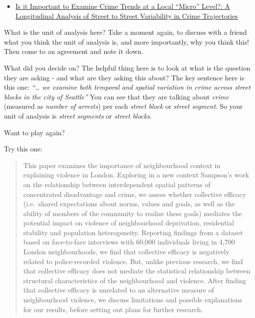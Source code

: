 \documentclass[
]{book}
\providecommand{\tightlist}{%
  \setlength{\itemsep}{0pt}\setlength{\parskip}{0pt}}
\begin{document}
\begin{itemize}
\tightlist
\item
  \href{https://link.springer.com/article/10.1007/s10940-009-9081-y}{Is it Important to Examine Crime Trends at a Local ``Micro'' Level?: A Longitudinal Analysis of Street to Street Variability in Crime Trajectories}
\end{itemize}

What is the unit of analysis here? Take a moment again, to discuss with a friend what you think the unit of analysis is, and more importantly, why you think this! Then come to an agreement and note it down.

What did you decide on? The helpful thing here is to look at what is the question they are asking - and what are they asking this about? The key sentence here is this one: \emph{``\ldots{} we examine both temporal and spatial variation in crime across street blocks in the city of Seattle''} You can see that they are talking about \emph{crime} (measured as \emph{number of arrests}) per each \emph{street block} or \emph{street segment}. So your unit of analysis is \emph{street segments} or \emph{street blocks}.

Want to play again?

Try this one:

\begin{quote}
This paper examines the importance of neighbourhood context in explaining violence in London. Exploring in a new context Sampson's work on the relationship between interdependent spatial patterns of concentrated disadvantage and crime, we assess whether collective efficacy (i.e.~shared expectations about norms, values and goals, as well as the ability of members of the community to realize these goals) mediates the potential impact on violence of neighbourhood deprivation, residential stability and population heterogeneity. Reporting findings from a dataset based on face-to-face interviews with 60,000 individuals living in 4,700 London neighbourhoods, we find that collective efficacy is negatively related to police-recorded violence. But, unlike previous research, we find that collective efficacy does not mediate the statistical relationship between structural characteristics of the neighbourhood and violence. After finding that collective efficacy is unrelated to an alternative measure of neighbourhood violence, we discuss limitations and possible explanations for our results, before setting out plans for further research.
\end{quote}
\end{document}
